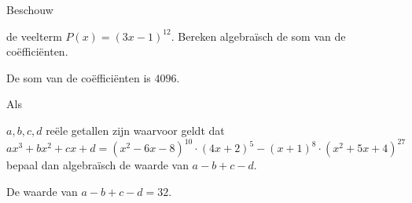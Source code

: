 \documentclass{ximera}
\begin{document}
\begin{exercise}\setcounter{enumi}{17} 
\hypertarget{oef1.17}{Beschouw} de veelterm $P(x) = (3x - 1)^{12}$. Bereken algebra\"isch de som van de co\"effici\"enten. 
\begin{oplossing} De som van de coëfficiënten is $4096$. \end{oplossing}
\end{exercise}

\begin{exercise}\setcounter{enumi}{18} 
\hypertarget{oef1.18}{Als} $a,b,c,d$ re\"ele getallen zijn waarvoor geldt dat
\[
ax^3 + bx^2 + cx + d = (x^2-6x-8)^{10}\cdot(4x+2)^5 - (x+1)^8\cdot(x^2+5x+4)^{27}
\]
bepaal dan algebra\"isch de waarde van $a-b+c-d$.
\begin{oplossing} De waarde van \(a-b+c-d = 32\).\end{oplossing}
\end{exercise}
\end{document}
